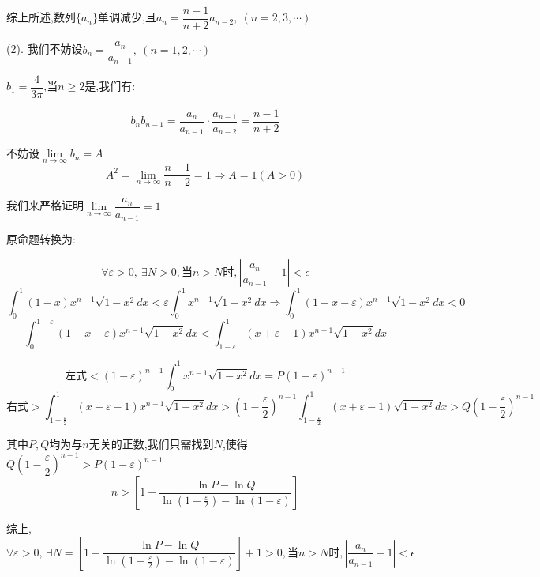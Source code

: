 \begin{solution}
	综上所述,$\text{数列}\{a_{n}\}\text{单调减少,且}a_{n}=\dfrac{n-1}{n+2}a_{n-2},\ (n=2,3,\cdots)$
	
	(2). 我们不妨设$b_{n}=\dfrac{a_{n}}{a_{n-1}},\ (n=1,2,\cdots)$
	
	$b_{1}=\dfrac{4}{3\pi}$,当$n\geq 2$是,我们有: 
	
	$$b_{n}b_{n-1}=\dfrac{a_{n}}{a_{n-1}}\cdot\dfrac{a_{n-1}}{a_{n-2}}=\dfrac{n-1}{n+2}$$
	
	不妨设$\lim\limits_{n\rightarrow \infty}b_{n}=A$
	$$ A^2=\lim\limits_{n\rightarrow \infty}\dfrac{n-1}{n+2}=1\Rightarrow A=1(A>0)$$
	
	我们来严格证明$\lim\limits_{n\rightarrow \infty}\dfrac{a_{n}}{a_{n-1}}=1$
	
	原命题转换为: 
	
	$$\forall \varepsilon>0,\ \exists N>0,\text{当}n>N\text{时},|\dfrac{a_{n}}{a_{n-1}}-1|<\epsilon$$
	$$\int_{0}^{1}(1-x)x^{n-1}\sqrt{1-x^2}dx<\varepsilon \int_{0}^{1}x^{n-1}\sqrt{1-x^2}dx\Rightarrow \int_{0}^{1}(1-x-\varepsilon)x^{n-1}\sqrt{1-x^2}dx<0$$
	$$\int_{0}^{1-\varepsilon}(1-x-\varepsilon)x^{n-1}\sqrt{1-x^2}dx<\int_{1-\varepsilon}^{1}(x+\varepsilon-1)x^{n-1}\sqrt{1-x^2}dx$$
	
	$$\text{左式}<(1-\varepsilon)^{n-1}\int_{0}^{1}x^{n-1}\sqrt{1-x^2}dx=P(1-\varepsilon)^{n-1}$$
	$$\text{右式}>\int_{1-\frac{\varepsilon}{2}}^{1}(x+\varepsilon-1)x^{n-1}\sqrt{1-x^2}dx>(1-\frac{\varepsilon}{2})^{n-1}\int_{1-\frac{\varepsilon}{2}}^{1}(x+\varepsilon-1)\sqrt{1-x^2}dx>Q(1-\frac{\varepsilon}{2})^{n-1}$$
	
	其中$P,Q$均为与$n$无关的正数,我们只需找到$N$,使得$Q(1-\dfrac{\varepsilon}{2})^{n-1}>P(1-\varepsilon)^{n-1}$
	$$n>[1+\dfrac{\ln P-\ln Q}{\ln(1-\frac{\varepsilon}{2})-\ln(1-\varepsilon)}]$$
	
	综上,$\forall \varepsilon>0,\ \exists N=[1+\dfrac{\ln P-\ln Q}{\ln(1-\frac{\varepsilon}{2})-\ln(1-\varepsilon)}]+1>0,\text{当}n>N\text{时},|\dfrac{a_{n}}{a_{n-1}}-1|<\epsilon$
\end{solution}
